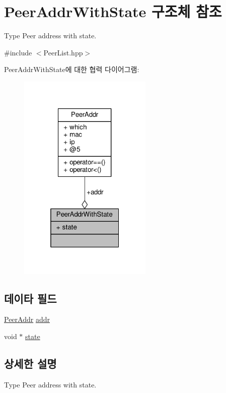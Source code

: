 \hypertarget{struct_peer_addr_with_state}{}\section{Peer\+Addr\+With\+State 구조체 참조}
\label{struct_peer_addr_with_state}


Type Peer address with state.  




{\ttfamily \#include $<$Peer\+List.\+hpp$>$}



Peer\+Addr\+With\+State에 대한 협력 다이어그램\+:
\nopagebreak
\begin{figure}[H]
\begin{center}
\leavevmode
\includegraphics[width=181pt]{struct_peer_addr_with_state__coll__graph}
\end{center}
\end{figure}
\subsection*{데이타 필드}
\begin{DoxyCompactItemize}
\item 
\hyperlink{class_peer_addr}{Peer\+Addr} \hyperlink{struct_peer_addr_with_state_a2fac2b1fbbf46cf80895a34807da1e5f}{addr}
\item 
void $\ast$ \hyperlink{struct_peer_addr_with_state_a441a9214dea76f74bf9d8b392cf4d355}{state}
\end{DoxyCompactItemize}


\subsection{상세한 설명}
Type Peer address with state. 

